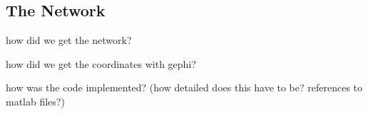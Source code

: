 \subsection{The Network}
how did we get the network?

how did we get the coordinates with gephi?

how was the code implemented? (how detailed does this have to be? references to matlab files?)